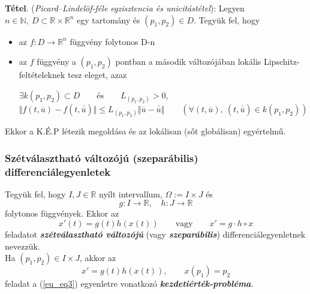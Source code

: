 \documentclass[12pt,margin=0px]{article}
\begin{document}
    \noindent \textbf{Tétel}. (\emph{Picard–Lindelöf-féle egzisztencia\text{-} és unicitástétel}): Legyen $n \in \mathbb{N},\ D \subset \mathbb{R} \times \mathbb{R}^{n}$ egy tartomány és $(p_1, p_2) \in D$. Tegyük fel, hogy
    \begin{itemize}
      \item az $f: D \to \mathbb{R}^{n}$ függvény folytonos D-n
      \item az $f$ függvény a $(p_1, p_2)$ pontban a második változójában lokális Lipschitz-feltételeknek tesz eleget, azaz
      \begin{center}
        $\exists k(p_1, p_2) \subset D \qquad \text{és}\qquad L_{(p_1, p_2)} > 0$,\ \\
        $\Vert f(t, \overline{u}) - f(t, \overline{\overline{u}})\Vert \leq L_{(p_1, p_2)}\Vert\overline{u} - \overline{\overline{u}}\Vert \qquad (\forall (t, \overline{u}),\ (t, \overline{\overline{u}}) \in k(p_1, p_2))$
      \end{center}
    \end{itemize}
    Ekkor a K.É.P létezik megoldása és az lokálisan (sőt globálisan) egyértelmű.\\

    \subsubsection*{Szétválasztható változójú (szeparábilis) differenciálegyenletek\\}

    \noindent Tegyük fel, hogy $I, J \in \mathbb{R}$ nyílt intervallum, $\Omega := I \times J$ és
    \[
        g: I \to \mathbb{R}, \quad h : J \to \mathbb{R}
    \]
    folytonos függvények. Ekkor az
    \begin{equation} \label{eu_eq3}
        x'(t) = g(t) h(x(t))\qquad \text{vagy}\qquad x' = g \cdot h \circ x
    \end{equation}
    feladatot \textbf{\emph{szétválasztható változójú}} (vagy \textbf{\emph{szeparábilis}}) differenciálegyenletnek nevezzük.\\

    \noindent Ha $(p_1, p_2) \in I \times J$, akkor az
    \begin{equation} \label{eu_eq4}
        x' = g(t)h(x(t)),\qquad x(p_1) = p_2
    \end{equation}
    feladat a (\ref{eu_eq3}) egyenletre vonatkozó \emph{\textbf{kezdetiérték-probléma}}.\\
\end{document}
